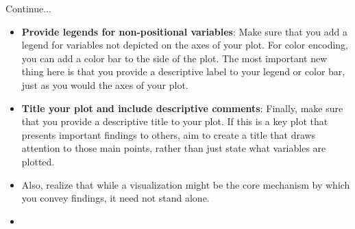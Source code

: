 \documentclass[12pt]{beamer}
\begin{document}
    \begin{frame}{Continue...}
    	\begin{itemize}
    		\item \textbf{Provide legends for non-positional variables}: Make sure that you add a legend for variables not depicted on the axes of your plot. For color encoding, you can add a color bar to the side of the plot. The most important new thing here is that you provide a descriptive label to your legend or color bar, just as you would the axes of your plot.
    		\item \textbf{Title your plot and include descriptive comments}: Finally, make sure that you provide a descriptive title to your plot. If this is a key plot that presents important findings to others, aim to create a title that draws attention to those main points, rather than just state what variables are plotted. 
    		\item Also, realize that while a visualization might be the core mechanism by which you convey findings, it need not stand alone.
    	\end{itemize}
    \end{frame}
    \begin{frame}{}
    	\begin{itemize}
    		\item 
    	\end{itemize}
    \end{frame}
\end{document}
